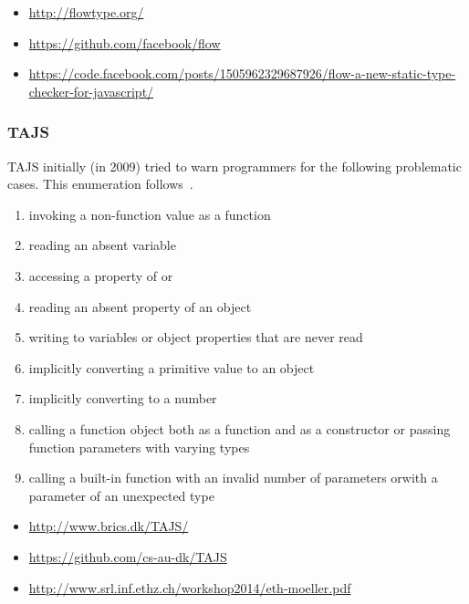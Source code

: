 
\begin{itemize}
\item \url{http://flowtype.org/}
\item \url{https://github.com/facebook/flow}
\item \url{https://code.facebook.com/posts/1505962329687926/flow-a-new-static-type-checker-for-javascript/}
\end{itemize}


\subsubsection{TAJS}

TAJS initially (in 2009) tried to warn programmers for the following problematic cases. This enumeration follows~\cite{jensen_type_2009}.

\begin{enumerate}
  \item invoking a non-function value as a function
  \item reading an absent variable
  \item accessing a property of  or 
  \item reading an absent property of an object
  \item writing to variables or object properties that are never read
  \item implicitly converting a primitive value to an object
  \item implicitly converting  to a number
  \item calling a function object both as a function and as a constructor or passing function parameters with varying types
  \item calling a built-in function with an invalid number of parameters orwith a parameter of an unexpected type
\end{enumerate}

\begin{itemize}
 \item \url{http://www.brics.dk/TAJS/}
 \item \url{https://github.com/cs-au-dk/TAJS}
 \item \url{http://www.srl.inf.ethz.ch/workshop2014/eth-moeller.pdf}
\end{itemize}

